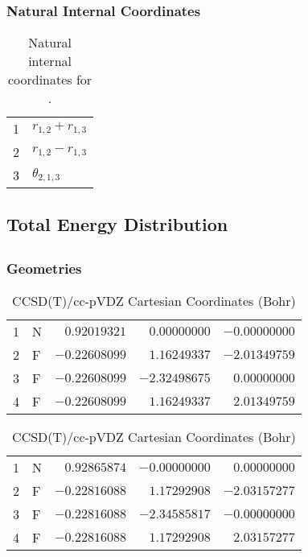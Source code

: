 \documentclass[10pt,oneside]{article}
\begin{document}
\begin{table}[h!]
\subsubsection*{Natural Internal Coordinates}
\centering
\caption{Natural internal coordinates for .}
\small
\begin{tabular}{ll}
\toprule
  1   & $r_{1,2} + r_{1,3}$ \\
  2   & $r_{1,2} - r_{1,3}$ \\
  3   & $\theta_{2,1,3}$ \\
\bottomrule
\end{tabular}
\end{table}

\begin{table}
\subsection*{Total Energy Distribution}
\centering\end{table}

\clearpage

\subsection{}

\begin{table}[h!]
\subsubsection*{Geometries}
\begin{multicols}{2}
\centering
\caption{CCSD(T)/cc-pVTZ Cartesian Coordinates (Bohr)}
\begin{tabular}{llrrr}
\toprule
1  & N  & $ 0.92019321$ & $ 0.00000000$ & $-0.00000000$ \\
2  & F  & $-0.22608099$ & $ 1.16249337$ & $-2.01349759$ \\
3  & F  & $-0.22608099$ & $-2.32498675$ & $ 0.00000000$ \\
4  & F  & $-0.22608099$ & $ 1.16249337$ & $ 2.01349759$ \\
\bottomrule
\end{tabular}
\caption{CCSD(T)/cc-pVDZ Cartesian Coordinates (Bohr)}
\begin{tabular}{llrrr}
\toprule
1  & N  & $ 0.92865874$ & $-0.00000000$ & $ 0.00000000$ \\
2  & F  & $-0.22816088$ & $ 1.17292908$ & $-2.03157277$ \\
3  & F  & $-0.22816088$ & $-2.34585817$ & $-0.00000000$ \\
4  & F  & $-0.22816088$ & $ 1.17292908$ & $ 2.03157277$ \\
\bottomrule
\end{tabular}
\end{multicols}
\end{table}
\end{document}
